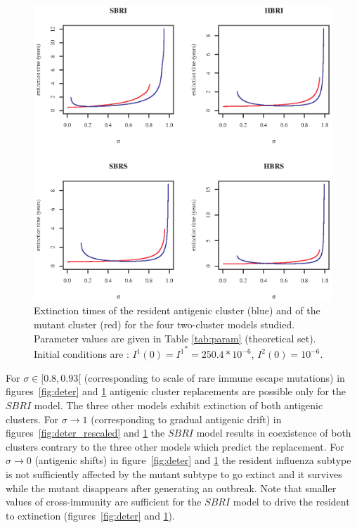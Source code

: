 \begin{figure}[!htbp]
\begin{center}
	\includegraphics[]{graphs/article1/figure_4.eps}
\end{center}
\caption{ Extinction times of the resident
  antigenic cluster (blue) and of the mutant cluster (red) for the
  four two-cluster models studied. Parameter values are given in Table
  \ref{tab:param} (theoretical set). Initial conditions are :
  ${I^1}(0) = {I^1}^*=250.4*10^{-6}$, ${I^2}(0)=10^{-6}$.}
\label{fig:reinv_theo12}
\end{figure}


For $\sigma \in [0.8, 0.93[$ (corresponding to \citet{Koelle2006}
scale of rare immune escape mutations) in figures~\ref{fig:deter} and
\ref{fig:reinv_theo12} antigenic cluster replacements are possible
only for the $SBRI$ model. The three other models exhibit extinction
of both antigenic clusters.
%
For $\sigma \to 1$ (corresponding to gradual antigenic drift) in
figures~\ref{fig:deter_rescaled} and \ref{fig:reinv_theo12} the $SBRI$
model results in coexistence of both clusters contrary to the three
other models which predict the replacement.
%
For $\sigma \to 0$ (antigenic shifts) in figure~\ref{fig:deter} and
\ref{fig:reinv_theo12} the resident influenza subtype is not
sufficiently affected by the mutant subtype to go extinct and it
survives while the mutant disappears after generating an outbreak.
Note that smaller values of cross-immunity are sufficient for the
$SBRI$ model to drive the resident to extinction
(figures~\ref{fig:deter} and \ref{fig:reinv_theo12}).

